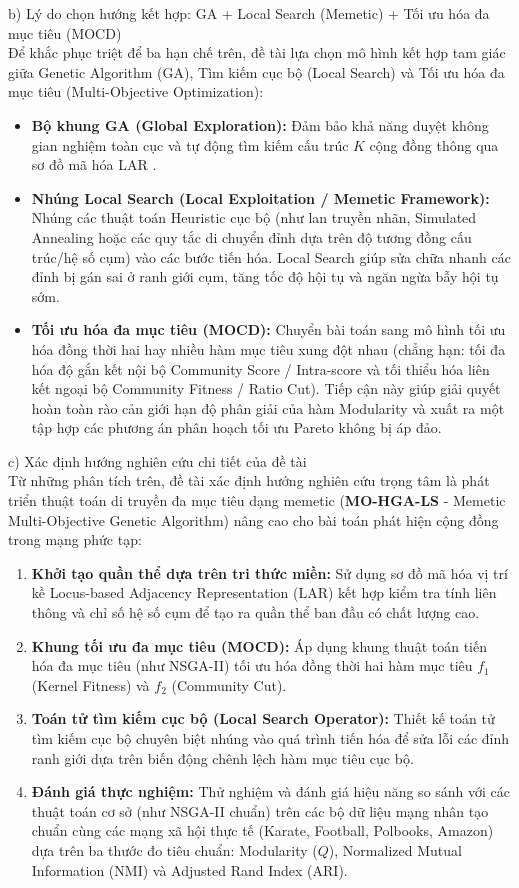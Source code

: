 \documentclass[14pt,a4paper]{extarticle}
\begin{document}
\noindent b) Lý do chọn hướng kết hợp: GA + Local Search (Memetic) + Tối ưu hóa đa mục tiêu (MOCD)
\\
Để khắc phục triệt để ba hạn chế trên, đề tài lựa chọn mô hình kết hợp tam giác giữa Genetic Algorithm (GA), Tìm kiếm cục bộ (Local Search) và Tối ưu hóa đa mục tiêu (Multi-Objective Optimization):
\begin{itemize}
    \item \textbf{Bộ khung GA (Global Exploration):} Đảm bảo khả năng duyệt không gian nghiệm toàn cục và tự động tìm kiếm cấu trúc $K$ cộng đồng thông qua sơ đồ mã hóa LAR \cite{Said2018}.
    \item \textbf{Nhúng Local Search (Local Exploitation / Memetic Framework):} Nhúng các thuật toán Heuristic cục bộ (như lan truyền nhãn, Simulated Annealing hoặc các quy tắc di chuyển đỉnh dựa trên độ tương đồng cấu trúc/hệ số cụm) vào các bước tiến hóa. Local Search giúp sửa chữa nhanh các đỉnh bị gán sai ở ranh giới cụm, tăng tốc độ hội tụ và ngăn ngừa bẫy hội tụ sớm.
    \item \textbf{Tối ưu hóa đa mục tiêu (MOCD):} Chuyển bài toán sang mô hình tối ưu hóa đồng thời hai hay nhiều hàm mục tiêu xung đột nhau (chẳng hạn: tối đa hóa độ gắn kết nội bộ Community Score / Intra-score và tối thiểu hóa liên kết ngoại bộ Community Fitness / Ratio Cut). Tiếp cận này giúp giải quyết hoàn toàn rào cản giới hạn độ phân giải của hàm Modularity và xuất ra một tập hợp các phương án phân hoạch tối ưu Pareto không bị áp đảo.
\end{itemize}

\noindent c) Xác định hướng nghiên cứu chi tiết của đề tài
\\
Từ những phân tích trên, đề tài xác định hướng nghiên cứu trọng tâm là phát triển thuật toán di truyền đa mục tiêu dạng memetic (\textbf{MO-HGA-LS} - Memetic Multi-Objective Genetic Algorithm) nâng cao cho bài toán phát hiện cộng đồng trong mạng phức tạp:
\begin{enumerate}
\item \textbf{Khởi tạo quần thể dựa trên tri thức miền:} Sử dụng sơ đồ mã hóa vị trí kề Locus-based Adjacency Representation (LAR) kết hợp kiểm tra tính liên thông và chỉ số hệ số cụm để tạo ra quần thể ban đầu có chất lượng cao.
\item \textbf{Khung tối ưu đa mục tiêu (MOCD):} Áp dụng khung thuật toán tiến hóa đa mục tiêu (như NSGA-II) tối ưu hóa đồng thời hai hàm mục tiêu $f_1$ (Kernel Fitness) và $f_2$ (Community Cut).
\item \textbf{Toán tử tìm kiếm cục bộ (Local Search Operator):} Thiết kế toán tử tìm kiếm cục bộ chuyên biệt nhúng vào quá trình tiến hóa để sửa lỗi các đỉnh ranh giới dựa trên biến động chênh lệch hàm mục tiêu cục bộ.
\item \textbf{Đánh giá thực nghiệm:} Thử nghiệm và đánh giá hiệu năng so sánh với các thuật toán cơ sở (như NSGA-II chuẩn) trên các bộ dữ liệu mạng nhân tạo chuẩn cùng các mạng xã hội thực tế (Karate, Football, Polbooks, Amazon) dựa trên ba thước đo tiêu chuẩn: Modularity ($Q$), Normalized Mutual Information (NMI) và Adjusted Rand Index (ARI).
\end{enumerate}
\end{document}
